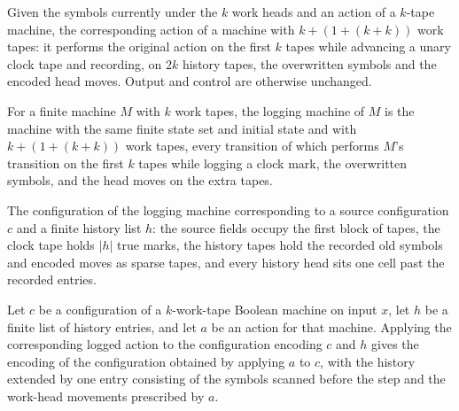 \begin{definition}
\label{Complexity.enumCont_logAction}
\leanok
{}
Given the symbols currently under the $k$ work heads and an action of a $k$-tape
machine, the corresponding action of a machine with $k + (1 + (k + k))$ work
tapes: it performs the original action on the first $k$ tapes while advancing a
unary clock tape and recording, on $2k$ history tapes, the overwritten symbols and
the encoded head moves. Output and control are otherwise unchanged.
\end{definition}

\begin{definition}
\label{Complexity.enumCont_logTM}
\leanok
{}
For a finite machine $M$ with $k$ work tapes, the logging machine of $M$ is the
machine with the same finite state set and initial state and with
$k + (1 + (k + k))$ work tapes, every transition of which performs $M$'s
transition on the first $k$ tapes while logging a clock mark, the overwritten
symbols, and the head moves on the extra tapes.
\end{definition}

\begin{definition}
\label{Complexity.enumCont_logCfg}
\leanok
{}
The configuration of the logging machine corresponding to a source configuration
$c$ and a finite history list $h$: the source fields occupy the first block of
tapes, the clock tape holds $|h|$ true marks, the history tapes hold the recorded
old symbols and encoded moves as sparse tapes, and every history head sits one
cell past the recorded entries.
\end{definition}

\begin{lemma}
\label{Complexity.enumCont_log_apply}
\leanok
{}
Let $c$ be a configuration of a $k$-work-tape Boolean machine on input $x$, let $h$ be a
finite list of history entries, and let $a$ be an action for that machine. Applying the
corresponding logged action to the configuration encoding $c$ and $h$ gives the encoding
of the configuration obtained by applying $a$ to $c$, with the history extended by one
entry consisting of the symbols scanned before the step and the work-head movements
prescribed by $a$.
\end{lemma}


